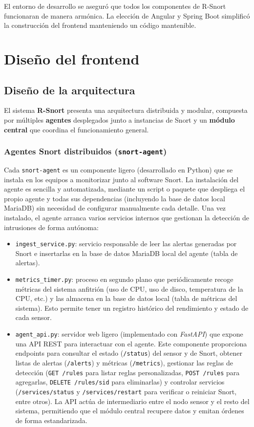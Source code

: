 \documentclass[11pt,a4paper,twoside]{report}
\begin{document}
El entorno de desarrollo se aseguró que todos los componentes de R-Snort funcionaran de manera armónica. La elección de Angular y Spring Boot simplificó la construcción del frontend manteniendo un código mantenible.

\section{Diseño del frontend}

\subsection{Diseño de la arquitectura}

El sistema \textbf{R-Snort} presenta una arquitectura distribuida y modular, compuesta por múltiples \textbf{agentes} desplegados junto a instancias de Snort y un \textbf{módulo central} que coordina el funcionamiento general.

\subsubsection{Agentes Snort distribuidos (\texttt{snort-agent})}

Cada \texttt{snort-agent} es un componente ligero (desarrollado en Python) que se instala en los equipos a monitorizar junto al software Snort. La instalación del agente es sencilla y automatizada, mediante un script o paquete que despliega el propio agente y todas sus dependencias (incluyendo la base de datos local MariaDB) sin necesidad de configurar manualmente cada detalle. Una vez instalado, el agente arranca varios servicios internos que gestionan la detección de intrusiones de forma autónoma:

\begin{itemize}
	\item \texttt{ingest\_service.py}: servicio responsable de leer las alertas generadas por Snort e insertarlas en la base de datos MariaDB local del agente (tabla de alertas).
	\item \texttt{metrics\_timer.py}: proceso en segundo plano que periódicamente recoge métricas del sistema anfitrión (uso de CPU, uso de disco, temperatura de la CPU, etc.) y las almacena en la base de datos local (tabla de métricas del sistema). Esto permite tener un registro histórico del rendimiento y estado de cada sensor.
	\item \texttt{agent\_api.py}: servidor web ligero (implementado con \textit{FastAPI}) que expone una API REST para interactuar con el agente. Este componente proporciona endpoints para consultar el estado (\texttt{/status}) del sensor y de Snort, obtener listas de alertas (\texttt{/alerts}) y métricas (\texttt{/metrics}), gestionar las reglas de detección (\texttt{GET /rules} para listar reglas personalizadas, \texttt{POST /rules} para agregarlas, \texttt{DELETE /rules/{sid}} para eliminarlas) y controlar servicios (\texttt{/services/status} y \texttt{/services/restart} para verificar o reiniciar Snort, entre otros). La API actúa de intermediario entre el nodo sensor y el resto del sistema, permitiendo que el módulo central recupere datos y emitan órdenes de forma estandarizada.
\end{itemize}
\end{document}
